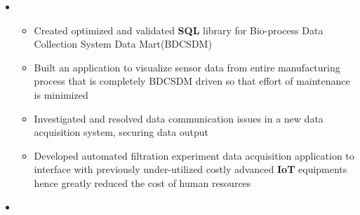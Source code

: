 \documentclass[11pt,a4paper,sans]{moderncv}        %
\begin{document}
\begin{itemize}
	\item{
		{\vspace{3pt}
		    \begin{itemize} pt
				\item Created optimized and validated \textbf{SQL} library for Bio-process Data Collection System Data Mart(BDCSDM) %
				\item Built an application to visualize sensor data from entire manufacturing process that is completely BDCSDM driven so that effort of maintenance is minimized
				\item Investigated and resolved data communication issues in a new data acquisition system, securing data output%
				\item Developed automated filtration experiment data acquisition application to interface with previously under-utilized costly advanced \textbf{IoT} equipments hence greatly reduced the cost of human resources %
			\end{itemize}}}

	\vspace{4pt}

	\item{}

\end{itemize}
\end{document}

